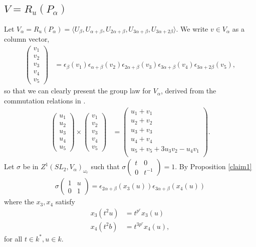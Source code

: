 	\subsection{$V = R_u(P_\alpha)$}
	\label{g2:alpha}
	Let $V_\alpha = R_u(P_\alpha) = \langle U_\beta, U_{\alpha+\beta}, U_{2\alpha+\beta}, U_{3\alpha+\beta}, U_{3\alpha+2\beta}\rangle$.
	We write $v \in V_\alpha$ as a column vector,
	\begin{align*}
	\left(\begin{matrix}
			v_1\\
			v_2\\
			v_3\\
			v_4\\
			v_5
			\end{matrix}\right) &=
\epsilon_{\beta}(v_1)
\epsilon_{\alpha+\beta}(v_2)
\epsilon_{2\alpha+\beta}(v_3)
\epsilon_{3\alpha+\beta}(v_4)
	\epsilon_{3\alpha+2\beta}(v_5),
	\end{align*}
	so that we can clearly present the group law for $V_\alpha$, derived from the commutation relations in \cite[\S 33.5]{humphreys1975linear}.
	\begin{align*}
	\left(\begin{matrix}
			u_1\\
			u_2\\
			u_3\\
			u_4\\
			u_5
			\end{matrix}\right)\times
	\left(\begin{matrix}
			v_1\\
			v_2\\
			v_3\\
			v_4\\
			v_5
			\end{matrix}\right)
	&= \left(\begin{matrix}
			u_1 + v_1\\
			u_2 + v_2\\
			u_3 + v_3\\
			u_4 + v_4\\
			u_5 + v_5 + 3u_3v_2 - u_4v_1\\
			\end{matrix}\right).
	\end{align*}
	Let $\sigma$ be in $Z^1(SL_2, V_\alpha)_{\omega_r}$ such that $\sigma\left(\begin{matrix}t & 0\\0 & t^{-1}\end{matrix}\right) = 1$.
	By Proposition \ref{claim1}
	\begin{align*}
	\sigma\left(\begin{matrix} 1 & u \\ 0 & 1 \end{matrix}\right) =
\epsilon_{2\alpha+\beta}(x_3(u))
\epsilon_{3\alpha+\beta}(x_4(u))
	\end{align*}
	where the $x_3, x_4$ satisfy
	\begin{align}
	x_3(t^2u) &= t^{p^r}x_3(u)\label{eqn:g2x3}\\
							 x_4(t^2b) &= t^{3p^r}x_4(u)\label{eqn:g2x4},
	\end{align}
	for all $t\in k^*, u\in k$.

